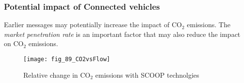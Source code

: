 \begin{frame}
\frametitle{Potential impact of Connected vehicles}
Earlier messages may potentially increase the impact of CO$_2$ emissions. The \emph{market penetration rate} is an important factor that may also reduce the impact on CO$_2$ emissions.
    \begin{figure}
        \centering
        \texttt{[image: fig\_89\_CO2vsFlow]}
        \caption{Relative change in CO$_2$ emissions with SCOOP technolgies}
    \end{figure}
\end{frame}